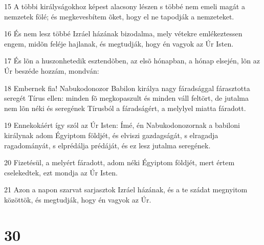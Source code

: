 \par 15 A többi királyságokhoz képest alacsony lészen s többé nem emeli magát a nemzetek fölé; és megkevesbítem õket, hogy el ne tapodják a nemzeteket.
\par 16 És nem lesz többé Izráel házának bizodalma, mely vétekre emlékeztessen engem, midõn feléje hajlanak, és megtudják, hogy én vagyok az Úr Isten.
\par 17 És lõn a huszonhetedik esztendõben, az elsõ hónapban, a hónap elsején, lõn az Úr beszéde hozzám, mondván:
\par 18 Embernek fia! Nabukodonozor Babilon királya nagy fáradsággal fárasztotta seregét Tírus ellen: minden fõ megkopaszult és minden váll feltört, de jutalma nem lõn néki és seregének Tírusból a fáradságért, a melylyel miatta fáradott.
\par 19 Ennekokáért így szól az Úr Isten: Ímé, én Nabukodonozornak a babiloni királynak adom Égyiptom földjét, és elviszi gazdagságát, s elragadja ragadományát, s elprédálja prédáját, és ez lesz jutalma seregének.
\par 20 Fizetésül, a melyért fáradott, adom néki Égyiptom földjét, mert értem cselekedtek, ezt mondja az Úr Isten.
\par 21 Azon a napon szarvat sarjasztok Izráel házának, és a te szádat megnyitom közöttök, és megtudják, hogy én vagyok az Úr.

\chapter{30}

